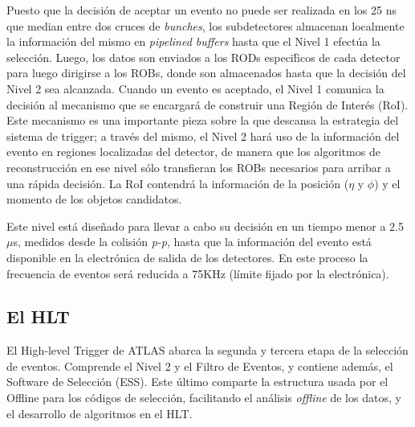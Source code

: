    Puesto que la decisi\'on de aceptar un evento no puede ser realizada en los 25 ns que median entre dos cruces de \emph{bunches}, los subdetectores almacenan localmente la informaci\'on del mismo en \emph{pipelined buffers} hasta que el Nivel 1 efect\'ua la selecci\'on. Luego, los datos son enviados a los RODs especi\'ficos de cada detector para luego dirigirse a los ROBs, donde son almacenados hasta que la decisi\'on del Nivel 2 sea alcanzada. 
   Cuando un evento es aceptado, el Nivel 1 comunica la decisi\'on al mecanismo que se encargar\'a de construir una Regi\'on de Inter\'es (RoI). Este mecanismo es una importante pieza sobre la que descansa la estrategia del sistema de trigger; a trav\'es del mismo, el Nivel 2 har\'a uso de la informaci\'on del evento en regiones localizadas del detector, de manera que los algoritmos de reconstrucci\'on en ese nivel s\'olo transfieran los ROBs necesarios para arribar a una r\'apida decisi\'on. %
La RoI contendr\'a la informaci\'on de la posici\'on ($\eta$ y $\phi$) y el momento de los objetos candidatos.

   Este nivel est\'a dise\~nado para llevar a cabo su decisi\'on en un tiempo menor a 2.5 $\mu$s, medidos desde la colisi\'on \emph{p-p}, hasta que la informaci\'on del evento est\'a disponible en la electr\'onica de salida de los detectores. En este proceso la frecuencia de eventos ser\'a reducida a 75KHz (l\'imite fijado por la electr\'onica).

\subsection{El HLT}

 El High-level Trigger de ATLAS abarca la segunda y tercera etapa de la selecci\'on de eventos. Comprende el Nivel 2 y el Filtro de Eventos, y contiene adem\'as, el Software de Selecci\'on (ESS). Este \'ultimo comparte la estructura usada por el Offline para los c\'odigos de selecci\'on, facilitando el an\'alisis \emph{offline} de los datos, y el desarrollo de algoritmos en el HLT.

